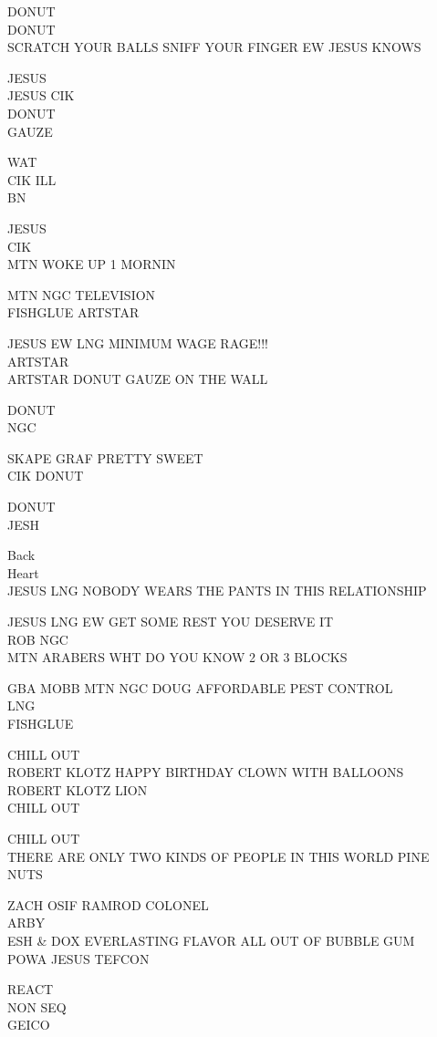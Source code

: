 \documentclass[10pt,letterpaper]{article}
\begin{document}
DONUT\\
DONUT\\
SCRATCH YOUR BALLS SNIFF YOUR FINGER EW JESUS KNOWS

JESUS\\
JESUS CIK\\
DONUT\\
GAUZE

WAT\\
CIK ILL\\
BN

JESUS\\
CIK\\
MTN WOKE UP 1 MORNIN

MTN NGC TELEVISION\\
FISHGLUE ARTSTAR

JESUS EW LNG MINIMUM WAGE RAGE!!!\\
ARTSTAR\\
ARTSTAR DONUT GAUZE ON THE WALL

DONUT\\
NGC

SKAPE GRAF PRETTY SWEET\\
CIK DONUT

DONUT\\
JESH

Back\\
Heart\\
JESUS LNG NOBODY WEARS THE PANTS IN THIS RELATIONSHIP

JESUS LNG EW GET SOME REST YOU DESERVE IT\\
ROB NGC\\
MTN ARABERS WHT DO YOU KNOW 2 OR 3 BLOCKS

GBA MOBB MTN NGC DOUG AFFORDABLE PEST CONTROL\\
LNG\\
FISHGLUE

CHILL OUT\\
ROBERT KLOTZ HAPPY BIRTHDAY CLOWN WITH BALLOONS\\
ROBERT KLOTZ LION\\
CHILL OUT

CHILL OUT\\
THERE ARE ONLY TWO KINDS OF PEOPLE IN THIS WORLD PINE NUTS

ZACH OSIF RAMROD COLONEL\\
ARBY\\
ESH \& DOX EVERLASTING FLAVOR ALL OUT OF BUBBLE GUM\\
POWA JESUS TEFCON

REACT\\
NON SEQ\\
GEICO
\end{document}
